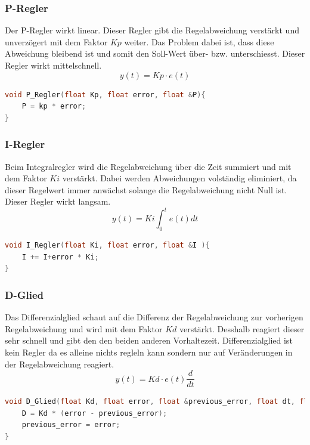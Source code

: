\documentclass[12pt,a4paper, ngerman]{article}
\begin{document}
\subsubsection{P-Regler}
Der P-Regler wirkt linear. Dieser Regler gibt die Regelabweichung verstärkt und unverzögert mit dem Faktor $Kp$ weiter. Das Problem dabei ist, dass diese Abweichung bleibend ist und somit den Soll-Wert über- bzw. unterschiesst. Dieser Regler wirkt mittelschnell.\cite{website:rn-wissen_Regelungstechnik}
\begin{equation}
y(t)=Kp\cdot e(t)
\end{equation}
\begin{lstlisting}[language=C++,caption=P-Regler C++ Pseudocode]
void P_Regler(float Kp, float error, float &P){
	P = kp * error;
}
\end{lstlisting}

\subsubsection{I-Regler}
Beim Integralregler wird die Regelabweichung über die Zeit summiert und mit dem Faktor $Ki$ verstärkt. Dabei werden Abweichungen volständig eliminiert, da dieser Regelwert immer anwächst solange die Regelabweichung nicht Null ist. Dieser Regler wirkt langsam.\cite{website:rn-wissen_Regelungstechnik}\\
\begin{equation}
y(t)=Ki\int_{0}^{t}e(t)dt
\end{equation}
\begin{lstlisting}[language=C++,caption=I-Regler C++ Pseudocode]
void I_Regler(float Ki, float error, float &I ){
	I += I+error * Ki;
}
\end{lstlisting}

\subsubsection{D-Glied}
Das Differenzialglied schaut auf die Differenz der Regelabweichung zur vorherigen Regelabweichung und wird mit dem Faktor $Kd$ verstärkt. Desshalb reagiert dieser sehr schnell und gibt den den beiden anderen Vorhaltezeit. Differenzialglied ist kein Regler da es alleine nichts regleln kann sondern nur auf Veränderungen in der Regelabweichung reagiert.\cite{website:rn-wissen_Regelungstechnik}\\
\begin{equation}
y(t)=Kd\cdot e(t)\frac{d}{dt}
\end{equation}
\begin{lstlisting}[language=C++,caption=D-Regler C++ Pseudocode]
void D_Glied(float Kd, float error, float &previous_error, float dt, float &D){
	D = Kd * (error - previous_error);
	previous_error = error;
}
\end{lstlisting}
\end{document}
